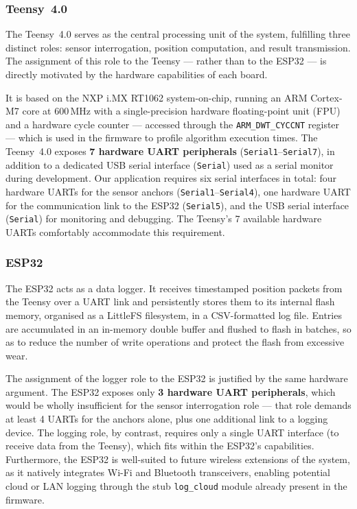 \subsubsection{Teensy~4.0}

The Teensy~4.0 serves as the central processing unit of the system, fulfilling three distinct roles: sensor interrogation, position computation, and result transmission. The assignment of this role to the Teensy --- rather than to the ESP32 --- is directly motivated by the hardware capabilities of each board.

It is based on the NXP i.MX RT1062 system-on-chip, running an ARM Cortex-M7 core at $600\,\text{MHz}$ with a single-precision hardware floating-point unit (FPU) and a hardware cycle counter --- accessed through the \texttt{ARM\_DWT\_CYCCNT} register --- which is used in the firmware to profile algorithm execution times. The Teensy~4.0 exposes \textbf{7 hardware UART peripherals} (\texttt{Serial1}--\texttt{Serial7}), in addition to a dedicated USB serial interface (\texttt{Serial}) used as a serial monitor during development. Our application requires six serial interfaces in total: four hardware UARTs for the sensor anchors (\texttt{Serial1}--\texttt{Serial4}), one hardware UART for the communication link to the ESP32 (\texttt{Serial5}), and the USB serial interface (\texttt{Serial}) for monitoring and debugging. The Teensy's 7 available hardware UARTs comfortably accommodate this requirement.

\subsubsection{ESP32}

The ESP32 acts as a data logger. It receives timestamped position packets from the Teensy over a UART link and persistently stores them to its internal flash memory, organised as a LittleFS filesystem, in a CSV-formatted log file. Entries are accumulated in an in-memory double buffer and flushed to flash in batches, so as to reduce the number of write operations and protect the flash from excessive wear.

The assignment of the logger role to the ESP32 is justified by the same hardware argument. The ESP32 exposes only \textbf{3 hardware UART peripherals}, which would be wholly insufficient for the sensor interrogation role --- that role demands at least 4 UARTs for the anchors alone, plus one additional link to a logging device. The logging role, by contrast, requires only a single UART interface (to receive data from the Teensy), which fits within the ESP32's capabilities. Furthermore, the ESP32 is well-suited to future wireless extensions of the system, as it natively integrates Wi-Fi and Bluetooth transceivers, enabling potential cloud or LAN logging through the stub \texttt{log\_cloud} module already present in the firmware.

